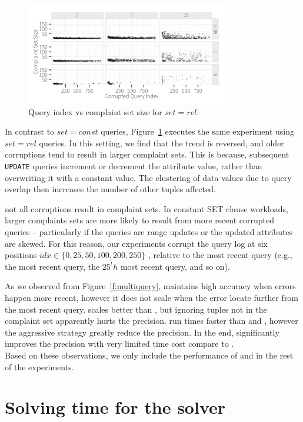 \begin{figure}[h]
\centering
\includegraphics[width = 3.5in]{figures/qidxsimulation/qidx_v_ncomplaints_20attrs_rel}
\caption{Query index vs complaint set size for $set = rel$.}
\label{f:qidx_v_ncomplaints_rel} 
\end{figure}

In contrast to $set=const$ queries, Figure~\ref{f:qidx_v_ncomplaints_rel} executes the 
same experiment using $set=rel$ queries.  In this setting, we find that the trend is
reversed, and older corruptions tend to result in larger complaint sets.  This is because,
subsequent \texttt{UPDATE} queries increment or decrement the attribute value, rather than
overwriting it with a constant value.  The clustering of data values due to query overlap
then increases the number of other tuples affected.


not all corruptions result in complaint sets.
In constant SET clause workloads, larger complaints sets are more likely to
result from more recent corrupted queries -- particularly if the queries are range updates or
the updated attributes are skewed.
For this reason, our experiments corrupt the query log at six positions 
$idx \in \{0, 25, 50, 100, 200, 250\}$ , relative 
to the most recent query (e.g., the most recent query, the $25^th$ most recent query, and so on).



As we observed from Figure~\ref{f:multiquery}, \milpall maintains high accuracy when errors
happen more recent, however it does not scale when the error locate further from the most
recent query. \milptuple scales better than \milpall, but ignoring tuples not 
in the complaint set apparently hurts the precision. \milptuplestopearly run times faster
than \milpall and \milptuple, however the aggressive strategy greatly reduce the 
precision. In the end, \milpadvtuple significantly improves the precision with very limited
time cost compare to \milptuple. \\
Based on these observations, we only include the performance of \milpadvtuple and \milpadvall
in the rest of the experiments. 

\section{Solving time for the solver}
\label{app:solvtime}
